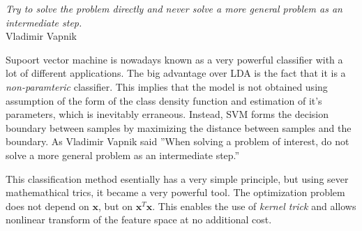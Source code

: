 \documentclass{article}
\begin{document}
\begin{myquote}
\begin{flushright}
\textit{Try to solve the problem directly and never solve a more general problem as an intermediate step.} \\Vladimir Vapnik
\end{flushright}
\end{myquote}




Supoort vector machine is nowadays known as a very powerful classifier with a lot of different applications. The big advantage over LDA is the fact that it is a \emph{non-paramteric} classifier. This implies that the model is not obtained using assumption of the form of the class density function and estimation of it's parameters, which is inevitably erraneous. Instead, SVM forms the decision boundary between samples by maximizing the distance between samples and the boundary.
As Vladimir Vapnik said ''When solving a problem of interest, do not solve a more general problem as an intermediate step.''

This classification method esentially has a very simple principle, but using sever mathemathical trics, it became a very powerful tool. The optimization problem does not depend on $\mathbf{x}$, but on $\mathbf{x}^T\mathbf{x}$. This enables the use of \emph{kernel trick} and allows nonlinear transform of the feature space at no additional cost. 
\end{document}
